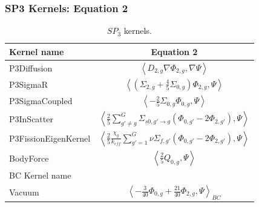 \begin{frame}
\frametitle{SP3 Kernels: Equation 2}

\begin{table}[htbp!]
  \centering
  \caption{$SP_3$ kernels.}
  \begin{tabular}{lc}
  \toprule
  Kernel name           & Equation 2 \\
  \midrule
  P3Diffusion           & $\left< D_{2,g} \nabla \Phi_{2,g}, \nabla \Psi \right>$ \\
  P3SigmaR              & $\left< \left( \Sigma_{2,g} + \frac{4}{5} \Sigma_{0,g} \right) \Phi_{2,g}, \Psi \right>$ \\
  P3SigmaCoupled        & $\left< - \frac{2}{5} \Sigma_{0,g} \Phi_{0,g}, \Psi \right>$ \\
  P3InScatter           & $\left< \frac{2}{5} \sum_{g'\ne g}^G \Sigma_{s0,g' \rightarrow g} \left( \Phi_{0,g'} - 2 \Phi_{2,g'} \right), \Psi \right>$ \\
  P3FissionEigenKernel  & $\left< \frac{2}{5} \frac{\chi_g}{k_{eff}} \sum_{g'=1}^G \nu\Sigma_{f,g'} \left( \Phi_{0,g'} - 2 \Phi_{2,g'} \right), \Psi \right>$ \\
  BodyForce             & $\left< \frac{2}{5} Q_{0,g}, \Psi \right>$ \\
  \midrule
  BC Kernel name & \\
  \midrule
  Vacuum                & $\left< - \frac{3}{40} \Phi_{0,g} + \frac{21}{40} \Phi_{2,g}, \Psi \right>_{BC}$ \\
  \bottomrule
  \end{tabular}
\end{table}
\end{frame}
